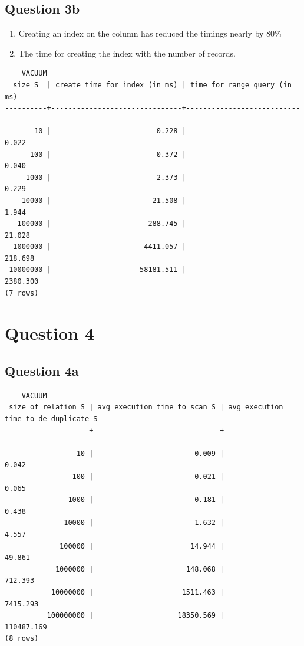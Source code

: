 \documentclass{article}
\begin{document}
  \subsection*{Question 3b}
  \begin{enumerate}
    \item Creating an index on the column has reduced the timings nearly by 80\%
    \item The time for creating the index with the number of records.
  \end{enumerate}
  \begin{verbatim}
    VACUUM
  size S  | create time for index (in ms) | time for range query (in ms) 
----------+-------------------------------+------------------------------
       10 |                         0.228 |                        0.022
      100 |                         0.372 |                        0.040
     1000 |                         2.373 |                        0.229
    10000 |                        21.508 |                        1.944
   100000 |                       288.745 |                       21.028
  1000000 |                      4411.057 |                      218.698
 10000000 |                     58181.511 |                     2380.300
(7 rows)
  \end{verbatim}
  \section*{Question 4}
  \subsection*{Question 4a}
  \begin{verbatim}
    VACUUM
 size of relation S | avg execution time to scan S | avg execution time to de-duplicate S 
--------------------+------------------------------+--------------------------------------
                 10 |                        0.009 |                                0.042
                100 |                        0.021 |                                0.065
               1000 |                        0.181 |                                0.438
              10000 |                        1.632 |                                4.557
             100000 |                       14.944 |                               49.861
            1000000 |                      148.068 |                              712.393
           10000000 |                     1511.463 |                             7415.293
          100000000 |                    18350.569 |                           110487.169
(8 rows)
  \end{verbatim}
\end{document}
